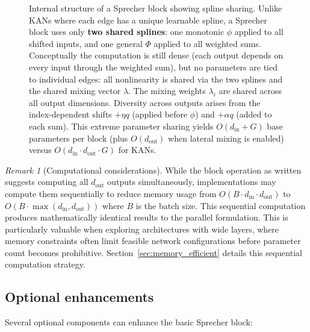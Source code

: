 \documentclass{article}
\theoremstyle{plain}
\theoremstyle{definition}
\theoremstyle{remark}
\newtheorem{remark}{Remark}
\begin{document}
\begin{figure}[ht]
\begin{tikzpicture}
\end{tikzpicture}
\caption{Internal structure of a Sprecher block showing spline sharing. Unlike KANs where each edge has a unique learnable spline, a Sprecher block uses only \textbf{two shared splines}: one monotonic $\phi$ applied to all shifted inputs, and one general $\Phi$ applied to all weighted sums. Conceptually the computation is still dense (each output depends on every input through the weighted sum), but no parameters are tied to individual edges: all nonlinearity is shared via the two splines and the shared mixing vector $\lambda$. The mixing weights $\lambda_i$ are shared across all output dimensions. Diversity across outputs arises from the index-dependent shifts $+\eta q$ (applied before $\phi$) and $+\alpha q$ (added to each sum). This extreme parameter sharing yields $O(d_{\mathrm{in}} + G)$ base parameters per block (plus $O(d_{\mathrm{out}})$ when lateral mixing is enabled) versus $O(d_{\mathrm{in}} \cdot d_{\mathrm{out}} \cdot G)$ for KANs.}
\label{fig:spline_sharing}
\end{figure}

\begin{remark}[Computational considerations]
While the block operation as written suggests computing all $d_{\mathrm{out}}$ outputs simultaneously, implementations may compute them sequentially to reduce memory usage from $O(B \cdot d_{\mathrm{in}} \cdot d_{\mathrm{out}})$ to $O(B \cdot \max(d_{\mathrm{in}}, d_{\mathrm{out}}))$ where $B$ is the batch size. This sequential computation produces mathematically identical results to the parallel formulation. This is particularly valuable when exploring architectures with wide layers, where memory constraints often limit feasible network configurations before parameter count becomes prohibitive. Section~\ref{sec:memory_efficient} details this sequential computation strategy.
\end{remark}

\subsection{Optional enhancements}\label{sec:optional_enhancements}
Several optional components can enhance the basic Sprecher block:
\end{document}
